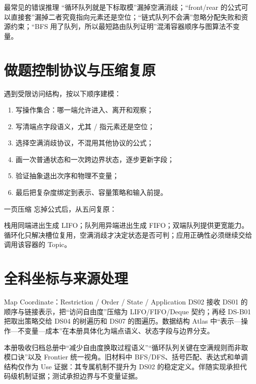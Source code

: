 \documentclass[UTF8,fontset=none,11pt,a4paper]{ctexart}
\begin{document}
\begin{warnbox}{最常见的错误推理}
“循环队列就是下标取模”漏掉空满消歧；“front/rear 的公式可以直接套”漏掉二者究竟指向元素还是空位；“链式队列不会满”忽略分配失败和资源约束；“BFS 用了队列，所以最短路由队列证明”混淆容器顺序与图算法不变量。
\end{warnbox}

\section{做题控制协议与压缩复原}
遇到受限访问结构，按以下顺序建模：
\begin{enumerate}
\item 写操作集合：哪一端允许进入、离开和观察；
\item 写清端点字段语义，尤其 / 指元素还是空位；
\item 选择空满消歧协议，不混用其他协议的公式；
\item 画一次普通状态和一次跨边界状态，逐步更新字段；
\item 验证抽象退出次序和物理不变量；
\item 最后把复杂度绑定到表示、容量策略和输入前提。
\end{enumerate}

\begin{corebox}{一页压缩}
忘掉公式后，从五问复原：

栈用同端进出生成 LIFO；队列用异端进出生成 FIFO；双端队列提供更宽能力。循环化只解决槽位复用，空满消歧才决定状态是否可判；应用正确性必须继续交给调用该容器的 Topic。
\end{corebox}

\section{全科坐标与来源处理}
\begin{corebox}{Map Coordinate：Restriction / Order / State / Application}
DS02 接收 DS01 的顺序与链接表示，把“访问自由度”压缩为 LIFO/FIFO/Deque 契约；再经 DS-B01 把取出策略交给 DS04 的树遍历和 DS07 的图遍历。数据结构 Atlas 中“表示—操作—不变量—成本”在本册具体化为端点语义、状态字段与边界分支。
\end{corebox}

本册吸收归档总册中“减少自由度换取过程语义”“循环队列关键在空满规则而非取模口诀”以及 Frontier 统一视角。旧材料中 BFS/DFS、括号匹配、表达式和单调结构仅作为 Use 证据：其专属机制不提升为 DS02 的稳定定义。伴随实现承担代码级机制证据；测试承担边界与不变量证据。
\end{document}
